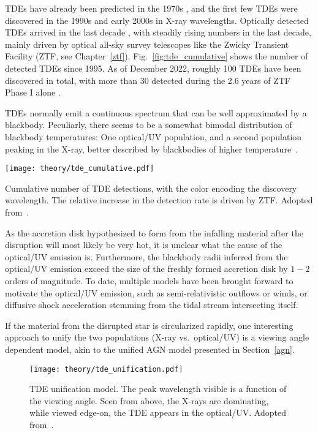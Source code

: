 TDEs have already been predicted in the 1970s , and the first few TDEs were discovered in the 1990s and early 2000s in X-ray wavelengths. Optically detected TDEs arrived in the last decade , with steadily rising numbers in the last decade, mainly driven by optical all-sky survey telescopes like the Zwicky Transient Facility (ZTF, see Chapter~\ref{ztf}). Fig.~\ref{fig:tde_cumulative} shows the number of detected TDEs since 1995. As of December 2022, roughly 100 TDEs have been discovered in total, with more than 30 detected during the 2.6 years of ZTF Phase I alone .

TDEs normally emit a continuous spectrum that can be well approximated by a blackbody. Peculiarly, there seems to be a somewhat bimodal distribution of blackbody temperatures: One optical/UV population, and a second population peaking in the X-ray, better described by blackbodies of higher temperature~\cite{Gezari2021}.

\begin{marginfigure}
    \texttt{[image: theory/tde\_cumulative.pdf]}
    \caption[TDE detections]{Cumulative number of TDE detections, with the color encoding the discovery wavelength. The relative increase in the detection rate is driven by ZTF\@. Adopted from~\cite{Gezari2021}.}
\end{marginfigure}

As the accretion disk hypothesized to form from the infalling material after the disruption will most likely be very hot, it is unclear what the cause of the optical/UV emission is. Furthermore, the blackbody radii inferred from the optical/UV emission exceed the size of the freshly formed accretion disk by $1-2$ orders of magnitude. To date, multiple models have been brought forward to motivate the optical/UV emission, such as semi-relativistic outflows or winds, or diffusive shock acceleration stemming from the tidal stream intersecting itself.

If the material from the disrupted star is circularized rapidly, one interesting approach to unify the two populations (X-ray vs.\ optical/UV) is a viewing angle dependent model, akin to the unified AGN model presented in Section~\ref{agn}.

\begin{figure}[htb]
    \texttt{[image: theory/tde\_unification.pdf]}
    \caption[TDE Unification]{TDE unification model. The peak wavelength visible is a function of the viewing angle. Seen from above, the X-rays are dominating, while viewed edge-on, the TDE appears in the optical/UV\@. Adopted from~\cite{Hayasaki2021}.}
\end{figure}

